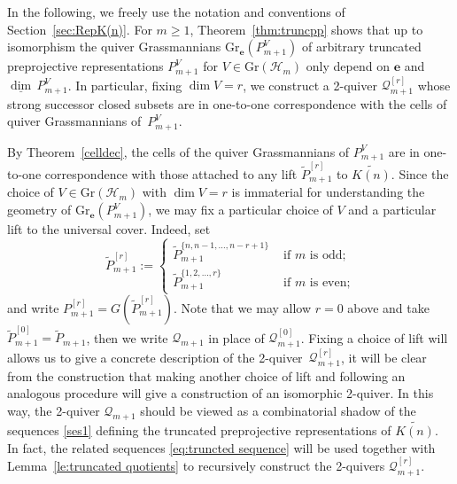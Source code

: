 \documentclass{amsart}
\newtheorem{remark}[theorem]{Remark}
\numberwithin{equation}{section}
\newcommand{\bfe}{\mathbf{e}}
\newcommand{\cH}{\mathcal{H}}
\newcommand{\cQ}{\mathcal{Q}}
\newcommand\udim{{\underline{\dim}\, }}
\newcommand{\Gr}{\mathrm{Gr}}
\begin{document}

In the following, we freely use the notation and conventions of Section~\ref{sec:RepK(n)}.
For $m\ge1$, Theorem~\ref{thm:truncpp} shows that up to isomorphism the quiver Grassmannians $\Gr_\bfe(P_{m+1}^V)$ of arbitrary truncated preprojective representations $P_{m+1}^V$ for $V\in\Gr(\cH_m)$ only depend on $\bfe$ and $\udim P_{m+1}^V$.
In particular, fixing $\dim V=r$, we construct a 2-quiver $\cQ_{m+1}^{[r]}$ whose strong successor closed subsets are in one-to-one correspondence with the cells of quiver Grassmannians of~$P_{m+1}^V$.

By Theorem~\ref{celldec}, the cells of the quiver Grassmannians of $P_{m+1}^V$ are in one-to-one correspondence with those attached to any lift $\tilde P_{m+1}^{[r]}$ to $\widetilde{K(n)}$.
Since the choice of $V\in\Gr(\cH_m)$ with $\dim V=r$ is immaterial for understanding the geometry of $\Gr_\bfe(P_{m+1}^V)$, we may fix a particular choice of $V$ and a particular lift to the universal cover.
Indeed, set
\[\tilde P_{m+1}^{[r]}:=
  \begin{cases}
    \tilde P_{m+1}^{\{n,n-1,\ldots,n-r+1\}} & \text{ if $m$ is odd;}\\
    \tilde P_{m+1}^{\{1,2,\ldots,r\}} & \text{ if $m$ is even;}
  \end{cases}\] 
and write $P_{m+1}^{[r]}=G(\tilde P_{m+1}^{[r]})$.
Note that we may allow $r=0$ above and take $\tilde P_{m+1}^{[0]}=\tilde P_{m+1}$, then we write $\cQ_{m+1}$ in place of $\cQ_{m+1}^{[0]}$.
Fixing a choice of lift will allows us to give a concrete description of the 2-quiver~$\cQ_{m+1}^{[r]}$, it will be clear from the construction that making another choice of lift and following an analogous procedure will give a construction of an isomorphic 2-quiver.
In this way, the 2-quiver $\cQ_{m+1}$ should be viewed as a combinatorial shadow of the sequences \eqref{ses1} defining the truncated preprojective representations of $\widetilde{K(n)}$.
In fact, the related sequences \eqref{eq:truncted sequence} will be used together with Lemma~\ref{le:truncated quotients} to recursively construct the 2-quivers $\cQ_{m+1}^{[r]}$.
\end{document}
